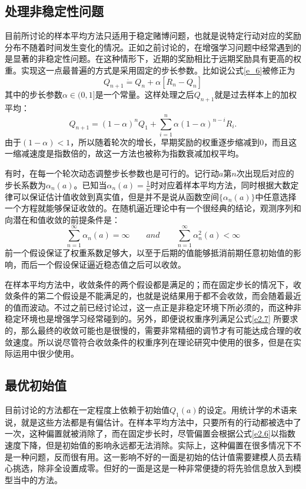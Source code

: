 \documentclass{ctexart}
\begin{document}
        \subsection{处理非稳定性问题}
            目前所讨论的样本平均方法只适用于稳定赌博问题，也就是说特定行动对应的奖励分布不随着时间发生变化的情况。正如之前讨论的，在增强学习问题中经常遇到的是显著的非稳定性问题。在这种情形下，近期的奖励相比于远期奖励具有更高的权重。实现这一点最普遍的方式是采用固定的步长参数。比如说公式\ref{e_6}被修正为
            \begin{equation}
                Q_{n+1} \dot{=} Q_n + \alpha [R_n -Q_n]
                \label{e2.5}
            \end{equation}
            其中的步长参数$\alpha\in (0,1]$是一个常量。这样处理之后$Q_{n+1}$就是过去样本上的加权平均：
            \begin{equation}
                Q_{n+1} = (1-\alpha)^n Q_1 + \sum_{i=1}^n \alpha (1-\alpha)^{n-i} R_i .
                \label{e2.6}
            \end{equation}
            由于$(1-\alpha)<1$，所以随着轮次的增长，早期奖励的权重逐步缩减到0，而且这一缩减速度是指数倍的，故这一方法也被称为指数衰减加权平均。

            有时，在每一个轮次动态调整步长参数也是可行的。记行动$a$第$n$次出现后对应的步长系数为$\alpha_n(a)$。已知当$\alpha_n(a)=\frac{1}{n}$时对应着样本平均方法，同时根据大数定律可以保证估计值收敛到真实值，但是并不是说从函数空间$\{\alpha_n(a)\}$中任意选择一个方程就能够保证收敛的。在随机逼近理论中有一个很经典的结论，观测序列和向潜在和值收敛的前提条件是：
            \begin{equation}
                \sum_{n=1}^{\infty} \alpha_n(a) = \infty \qquad and \qquad \sum_{n=1}^{\infty} \alpha_n^2(a) < \infty
                \label{e2.7}
            \end{equation}
            前一个假设保证了权重系数足够大，以至于后期的值能够抵消前期任意初始值的影响，而后一个假设保证逼近稳态值之后可以收敛。

            在样本平均方法中，收敛条件的两个假设都是满足的；而在固定步长的情况下，收敛条件的第二个假设是不能满足的，也就是说结果用于都不会收敛，而会随着最近的值而波动。不过之前已经讨论过，这一点正是非稳定环境下所必须的，而这种非稳定环境也是增强学习经常碰到的。另外，即便说权重序列满足公式\ref{e2.7} 所要求的，那么最终的收敛可能也是很慢的，需要非常精细的调节才有可能达成合理的收敛速度。所以说尽管符合收敛条件的权重序列在理论研究中使用的很多，但是在实际运用中很少使用。

        \subsection{最优初始值}
            目前讨论的方法都在一定程度上依赖于初始值$Q_1(a)$的设定。用统计学的术语来说，就是这些方法都是有偏估计。在样本平均方法中，只要所有的行动都被选中了一次，这种偏置就被消除了，而在固定步长时，尽管偏置会根据公式\ref{e2.6}以指数速度下降，但是初始值的影响永远都无法消除。实际上，这种偏置在很多情况下不是一种问题，反而很有用。这一影响不好的一面是初始的估计值需要建模人员去精心挑选，除非全设置成零。但好的一面是这是一种非常便捷的将先验信息放入到模型当中的方法。
\end{document}
